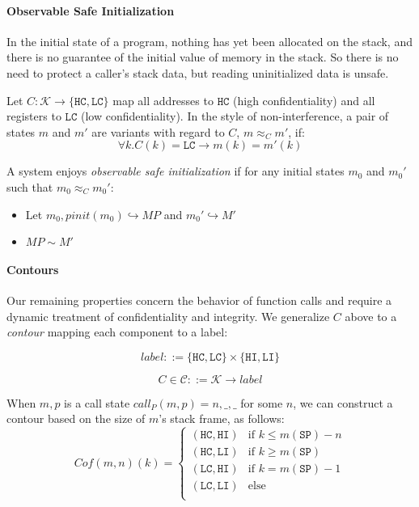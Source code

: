 \documentclass[conference]{IEEEtran}
\newcommand{\MP}{\mathit{MP}}
\begin{document}
    \paragraph{Observable Safe Initialization}

      In the initial state of a program, nothing has yet been allocated on the stack, and
      there is no guarantee of the initial value of memory in the stack. So there is no
      need to protect a caller's stack data, but reading uninitialized data is unsafe.

      Let \(C : \mathcal{K} \rightarrow \{\mathtt{HC},\mathtt{LC}\}\) map all addresses
      to \(\mathtt{HC}\) (high confidentiality) and all registers to \(\mathtt{LC}\)
      (low confidentiality). In the style of non-interference, a pair of states \(m\)
      and \(m'\) are variants with regard to \(C\), \(m \approx_C m'\), if:
      \[\forall k . C(k) = \mathtt{LC} \rightarrow m(k) = m'(k)\]
      
      A system enjoys {\it observable safe initialization} if for any initial states \(m_0\)
      and \(m_0'\) such that \(m_0 \approx_C m_0'\):

      \begin{itemize}
        \item Let \(m_0,\mathit{pinit}(m_0) \hookrightarrow \MP\) and \(m_0' \hookrightarrow M'\)
        \item \(\MP \sim M'\)
      \end{itemize}

    \paragraph{Contours}

      Our remaining properties concern the behavior of function calls and require a dynamic treatment
      of confidentiality and integrity. We generalize \(C\) above to a {\it contour} mapping each component
      to a label:

      \[\mathit{label} ::= \{\mathtt{HC},\mathtt{LC}\} \times \{\mathtt{HI},\mathtt{LI}\}\]

      \[C \in \mathcal{C} ::= \mathcal{K} \rightarrow \mathit{label}\]

      When \(m,p\) is a call state \(\mathit{call}_P(m,p) = n,\_,\_\) for some \(n\),
      we can construct a contour based on the size of \(m\)'s stack frame, as follows:
      \[\mathit{Cof}(m,n)(k) =
      \begin{cases}
        (\mathtt{HC},\mathtt{HI}) & \text{if } k \leq m(\mathtt{SP}) - n \\
        (\mathtt{HC},\mathtt{LI}) & \text{if } k \geq m(\mathtt{SP}) \\
        (\mathtt{LC},\mathtt{HI}) & \text{if } k = m(\mathtt{SP}) - 1 \\
        (\mathtt{LC},\mathtt{LI}) & \text{else} \\
      \end{cases}\]
\end{document}
